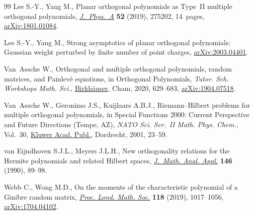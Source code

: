 \documentclass[pdftex]{sigma}
\numberwithin{equation}{section}
\begin{document}
\begin{thebibliography}{99}
Lee S.-Y., Yang M., Planar orthogonal polynomials as {T}ype~{II} multiple
 orthogonal polynomials, \href{https://doi.org/10.1088/1751-8121/ab1af9}{\textit{J.~Phys.~A}} \textbf{52} (2019), 275202,
 14~pages, \href{https://arxiv.org/abs/1801.01084}{arXiv:1801.01084}.

Lee S.-Y., Yang M., Strong asymptotics of planar orthogonal polynomials:
 {G}aussian weight perturbed by finite number of point charges,
 \href{https://arxiv.org/abs/2003.04401}{arXiv:2003.04401}.

Van~Assche W., Orthogonal and multiple orthogonal polynomials, random matrices,
 and {P}ainlev\'e equations, in Orthogonal Polynomials, \textit{Tutor. Sch. Workshops
 Math. Sci.}, \href{https://doi.org/10.1007/978-3-030-36744-2_22}{Birkh\"auser}, Cham, 2020, 629--683, \href{https://arxiv.org/abs/1904.07518}{arXiv:1904.07518}.

Van~Assche W., Geronimo J.S., Kuijlaars A.B.J., Riemann--{H}ilbert problems for
 multiple orthogonal polynomials, in Special Functions 2000: Current
 Perspective and Future Directions ({T}empe, {AZ}), \textit{NATO Sci. Ser.~II
 Math. Phys. Chem.}, Vol.~30, \href{https://doi.org/10.1007/978-94-010-0818-1_2}{Kluwer Acad. Publ.}, Dordrecht, 2001, 23--59.

van Eijndhoven S.J.L., Meyers J.L.H., New orthogonality relations for the
 {H}ermite polynomials and related {H}ilbert spaces, \href{https://doi.org/10.1016/0022-247X(90)90334-C}{\textit{J.~Math. Anal.
 Appl.}} \textbf{146} (1990), 89--98.

Webb C., Wong M.D., On the moments of the characteristic polynomial of a
 {G}inibre random matrix, \href{https://doi.org/10.1112/plms.12225}{\textit{Proc. Lond. Math. Soc.}} \textbf{118} (2019),
 1017--1056, \href{https://arxiv.org/abs/1704.04102}{arXiv:1704.04102}.

\end{thebibliography}\LastPageEnding
\end{document}
